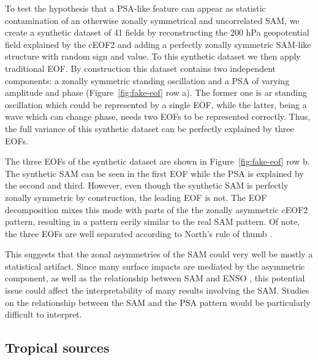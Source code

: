 \documentclass[smallextended]{svjour3}       %
\begin{document}
To test the hypothesis that a PSA-like feature can appear as statistic contamination of an otherwise zonally symmetrical and uncorrelated SAM, we create a synthetic dataset of 41 fields by reconstructing the 200 hPa geopotential field explained by the cEOF2 and adding a perfectly zonally symmetric SAM-like structure with random sign and value. To this synthetic dataset we then apply traditional EOF. By construction this dataset contains two independent components: a zonally symmetric standing oscillation and a PSA of varying amplitude and phase (Figure~\ref{fig:fake-eof} row a). The former one is ar standing oscillation which could be represented by a single EOF, while the latter, being a wave which can change phase, needs two EOFs to be represented correctly. Thus, the full variance of this synthetic dataset can be perfectly explained by three EOFs.

The three EOFs of the synthetic dataset are shown in Figure~\ref{fig:fake-eof} row b. The synthetic SAM can be seen in the first EOF while the PSA is explained by the second and third. However, even though the synthetic SAM is perfectly zonally symmetric by construction, the leading EOF is not. The EOF decomposition mixes this mode with parts of the the zonally asymmetric cEOF2 pattern, resulting in a pattern eerily similar to the real SAM pattern. Of note, the three EOFs are well separated according to North's rule of thumb \citep{north1982}.

This suggests that the zonal asymmetries of the SAM could very well be mostly a statistical artifact. Since many surface impacts are mediated by the asymmetric component, as well as the relationship between SAM and ENSO \citep{campitelli2021}, this potential issue could affect the interpretability of many results involving the SAM. Studies on the relationship between the SAM and the PSA pattern would be particularly difficult to interpret.

\hypertarget{tropical-sources}{%
\subsection{Tropical sources}\label{tropical-sources}}
\end{document}
